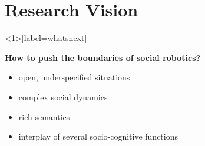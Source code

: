 \documentclass[compress]{beamer}
\begin{document}

\section{Research Vision}

\begin{frame}<1>[label=whatsnext]{}

    \begin{center}

    \Large
    \bf How to push the boundaries of social robotics?

    \end{center}

    \begin{itemize}
        \item open, underspecified situations
        \item complex social dynamics
        \item rich semantics
        \item interplay of several socio-cognitive functions
    \end{itemize}

\end{frame}
\end{document}
